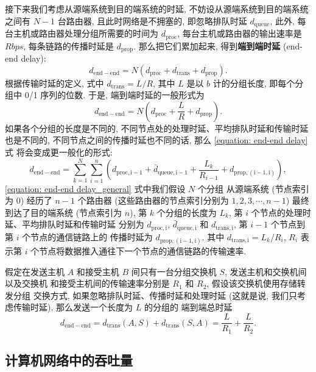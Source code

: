 \documentclass[10pt,UTF8]{book} %
\begin{document}
接下来我们考虑从源端系统到目的端系统的时延, 不妨设从源端系统到目的端系统
之间有 $N-1$ 台路由器, 且此时网络是不拥塞的, 即忽略排队时延 $d_\mathrm{queue}$,
此外, 每台主机或路由器处理分组所需要的时间为 $d_\mathrm{proc}$,
每台主机或路由器的输出速率是 $R \si{bps}$, 每条链路的传播时延是
$d_\mathrm{prop}$.
那么把它们累加起来, 得到\textbf{端到端时延} (end-end delay):
\[ d_\mathrm{end-end} = N \left(
    d_\mathrm{proc} + d_\mathrm{trans} + d_\mathrm{prop}
\right). \]
根据传输时延的定义, 式中 $d_\mathrm{trans} = L/R$, 其中 $L$ 是以 $\si{b}$
计的分组长度, 即每个分组中 0/1 序列的位数.
于是, 端到端时延的一般形式为
\begin{equation}
    \label{equation: end-end delay}
    d_\mathrm{end-end} = N \left(
        d_\mathrm{proc} + \dfrac{L}{R} + d_\mathrm{prop}
    \right).
\end{equation}
如果各个分组的长度是不同的, 不同节点处的处理时延、平均排队时延和传输时延也是不同的,
不同节点之间的传播时延也不同的话, 那么 \ref{equation: end-end delay} 式
将会变成更一般化的形式:
\begin{equation}
    \label{equation: end-end delay_general}
    d_\mathrm{end-end}
    = \sum_{k=1}^{N}
    \sum_{i=1}^{n} \left( d_\mathrm{proc, i-1} 
    + \bar{d}_\mathrm{queue, i-1}
    + \dfrac{L_k}{R_{i-1}} + d_\mathrm{prop, (i-1,i)} \right),
\end{equation}
\ref{equation: end-end delay_general} 式中我们假设 $N$ 个分组
从源端系统 (节点索引为 $0$) 经历了 $n-1$ 个路由器
(这些路由器的节点索引分别为 $1,2,3,\cdots, n-1$) 最终到达了目的端系统 
(节点索引为 $n$),
第 $k$ 个分组的长度为 $L_k$, 第 $i$ 个节点的处理时延、平均排队时延和传输时延
分别为 $d_\mathrm{proc, i}$, $\bar{d}_\mathrm{queue, i}$ 和
$d_\mathrm{trans, i}$, 第 $i-1$ 个节点到第 $i$ 个节点的通信链路上的
传播时延为 $d_\mathrm{prop, (i-1,i)}$. 其中 $d_\mathrm{trans, i} =
L_k/R_i$, $R_i$ 表示第 $i$ 个节点将数据推入通往下一个节点的通信链路的传输速率.

\begin{example}
    假定在发送主机 $A$ 和接受主机 $B$ 间只有一台分组交换机 $S$, 
    发送主机和交换机间以及交换机
    和接受主机间的传输速率分别是 $R_1$ 和 $R_2$, 假设该交换机使用存储转发分组
    交换方式, 如果忽略排队时延、传播时延和处理时延 (这就是说, 我们只考虑传输时延),
    那么发送一个长度为 $L$ 的分组的
    端到端总时延 \[ d_\mathrm{end-end} = d_\mathrm{trans}(A, S)
    + d_\mathrm{trans}(S, A) = \dfrac{L}{R_1} + \dfrac{L}{R_2}. \]
\end{example}

\subsection{计算机网络中的吞吐量}
\end{document}
